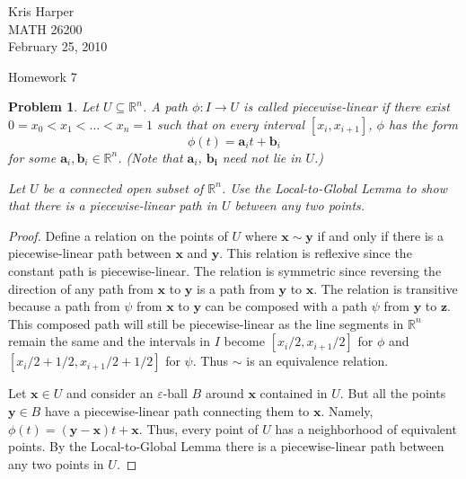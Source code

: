 \documentclass{article}
\newtheorem{problem}{Problem}
\begin{document}
\begin{flushright}
Kris Harper\\

MATH 26200\\

February 25, 2010
\end{flushright}

\begin{center}
Homework 7
\end{center}

\begin{problem}
Let $U \subseteq \mathbb{R}^n$. A path $\phi : I \to U$ is called \emph{piecewise-linear} if there exist $0 = x_0 < x_1 < \dots < x_n = 1$ such that on every interval $[x_i, x_{i+1}]$, $\phi$ has the form
\[
\phi(t) = \mathbf{a}_it + \mathbf{b}_i
\]
for some $\mathbf{a}_i, \mathbf{b}_i \in \mathbb{R}^n$. (Note that $\mathbf{a}_i$, $\mathbf{b_i}$ need not lie in $U$.)

Let $U$ be a connected open subset of $\mathbb{R}^n$. Use the Local-to-Global Lemma to show that there is a piecewise-linear path in $U$ between any two points.
\end{problem}
\begin{proof}
Define a relation on the points of $U$ where $\mathbf{x} \sim \mathbf{y}$ if and only if there is a piecewise-linear path between $\mathbf{x}$ and $\mathbf{y}$. This relation is reflexive since the constant path is piecewise-linear. The relation is symmetric since reversing the direction of any path from $\mathbf{x}$ to $\mathbf{y}$ is a path from $\mathbf{y}$ to $\mathbf{x}$. The relation is transitive because a path from $\psi$ from $\mathbf{x}$ to $\mathbf{y}$ can be composed with a path $\psi$ from $\mathbf{y}$ to $\mathbf{z}$. This composed path will still be piecewise-linear as the line segments in $\mathbb{R}^n$ remain the same and the intervals in $I$ become $[x_i/2, x_{i+1}/2]$ for $\phi$ and $[x_i/2 + 1/2, x_{i+1}/2 + 1/2]$ for $\psi$. Thus $\sim$ is an equivalence relation.

Let $\mathbf{x} \in U$ and consider an $\varepsilon$-ball $B$ around $\mathbf{x}$ contained in $U$. But all the points $\mathbf{y} \in B$ have a piecewise-linear path connecting them to $\mathbf{x}$. Namely, $\phi(t) = (\mathbf{y} - \mathbf{x})t + \mathbf{x}$. Thus, every point of $U$ has a neighborhood of equivalent points. By the Local-to-Global Lemma there is a piecewise-linear path between any two points in $U$.
\end{proof}
\end{document}
